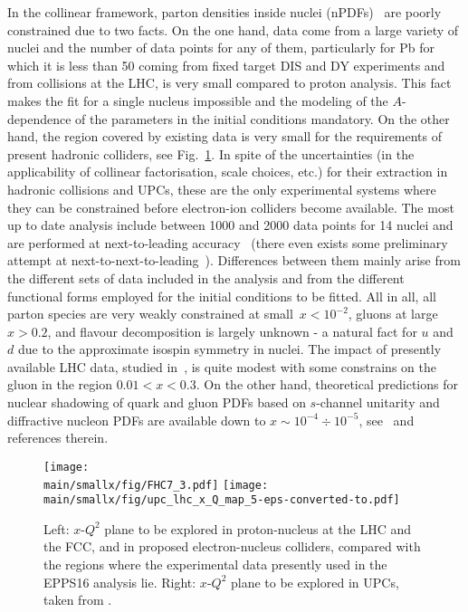 \documentclass[../report.tex]{subfiles}
\providecommand{\main}{..}
\begin{document}
In the collinear framework, parton densities inside nuclei (nPDFs)~\cite{Paukkunen:2017bbm,armestodis2018} are poorly constrained due to two facts. 
On the one hand, data come from a large variety of nuclei and the number of data points for any of them, particularly for Pb for which it is less than 50 coming from fixed target DIS and DY experiments and from \pPb collisions at the LHC, is very small compared to proton analysis. 
This fact makes the fit for a single nucleus impossible and the modeling of the $A$-dependence of the parameters in the initial conditions mandatory. On the other hand, the region covered by existing data is very small for the requirements of present hadronic colliders, see Fig.~\ref{fig:smallx1}. 
In spite of the uncertainties (in the applicability of collinear factorisation, scale choices, etc.) for their extraction in hadronic collisions and UPCs, these are the only experimental systems where they can be constrained before electron-ion colliders become available. 
The most up to date analysis include between 1000 and 2000 data points for 14 nuclei and are performed at next-to-leading accuracy~\cite{deFlorian:2011fp,Kovarik:2015cma,Eskola:2016oht} (there even exists some preliminary attempt at next-to-next-to-leading~\cite{Khanpour:2016pph}).
Differences between them mainly arise from the different sets of data included in the analysis and from the different functional forms employed for the initial conditions to be fitted. 
All in all, all parton species are very weakly constrained at small~$x<10^{-2}$, gluons at large~$x>0.2$, and flavour decomposition is largely unknown - a natural fact for $u$ and $d$ due to the approximate isospin symmetry in nuclei. 
The impact of presently available LHC data, studied in~\cite{Eskola:2016oht}, is quite modest with some constrains on the gluon in the region $0.01<x<0.3$. 
On the other hand, theoretical predictions for nuclear shadowing of quark and gluon PDFs  based on $s$-channel unitarity and diffractive nucleon PDFs are available down to $x \sim 10^{-4} \div 10^{-5}$, see~\cite{Frankfurt:2011cs,Armesto:2003fi} and references therein. 

\begin{figure}[htb]
\centering
\texttt{[image: \\main/smallx/fig/FHC7\_3.pdf]} \hfill \texttt{[image: \\main/smallx/fig/upc\_lhc\_x\_Q\_map\_5-eps-converted-to.pdf]}
\caption{Left: $x$-$Q^2$ plane to be explored in proton-nucleus at the LHC and the FCC, and in  proposed electron-nucleus colliders, compared with the regions where the experimental data presently used in the EPPS16 analysis \cite{Eskola:2016oht} lie. Right: $x$-$Q^2$ plane to be explored in UPCs, taken from \cite{Baltz:2007kq}.}
\label{fig:smallx1}
\end{figure}
\end{document}
